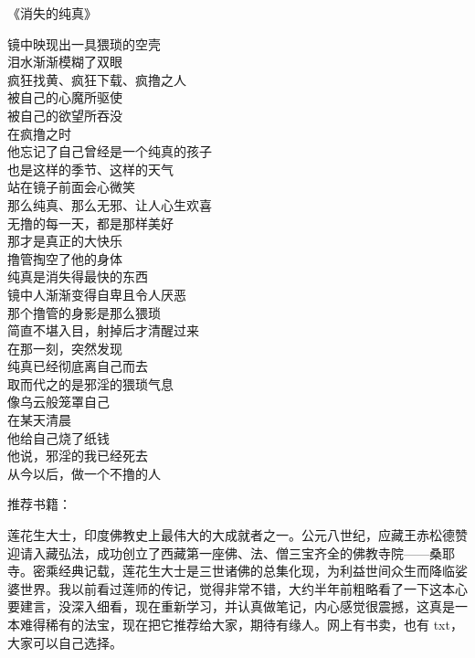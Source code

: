 \begin{center}
    《消失的纯真》\it
    \begin{multicols}{2}
        镜中映现出一具猥琐的空壳 \\ 泪水渐渐模糊了双眼 \\ 疯狂找黄、疯狂下载、疯撸之人 \\ 被自己的心魔所驱使 \\ 被自己的欲望所吞没 \\ 在疯撸之时 \\ 他忘记了自己曾经是一个纯真的孩子 \\ 也是这样的季节、这样的天气 \\ 站在镜子前面会心微笑 \\ 那么纯真、那么无邪、让人心生欢喜 \\ 无撸的每一天，都是那样美好 \\ 那才是真正的大快乐 \\ 撸管掏空了他的身体 \\ 纯真是消失得最快的东西 \\ 镜中人渐渐变得自卑且令人厌恶 \\ 那个撸管的身影是那么猥琐 \\ 简直不堪入目，射掉后才清醒过来 \\ 在那一刻，突然发现 \\ 纯真已经彻底离自己而去 \\ 取而代之的是邪淫的猥琐气息 \\ 像乌云般笼罩自己 \\ 在某天清晨 \\ 他给自己烧了纸钱 \\ 他说，邪淫的我已经死去 \\ 从今以后，做一个不撸的人
    \end{multicols}
\end{center}

推荐书籍：

\begin{book}
    莲花生大士，印度佛教史上最伟大的大成就者之一。公元八世纪，应藏王赤松德赞迎请入藏弘法，成功创立了西藏第一座佛、法、僧三宝齐全的佛教寺院——桑耶寺。密乘经典记载，莲花生大士是三世诸佛的总集化现，为利益世间众生而降临娑婆世界。我以前看过莲师的传记，觉得非常不错，大约半年前粗略看了一下这本心要建言，没深入细看，现在重新学习，并认真做笔记，内心感觉很震撼，这真是一本难得稀有的法宝，现在把它推荐给大家，期待有缘人。网上有书卖，也有 txt，大家可以自己选择。
\end{book}
